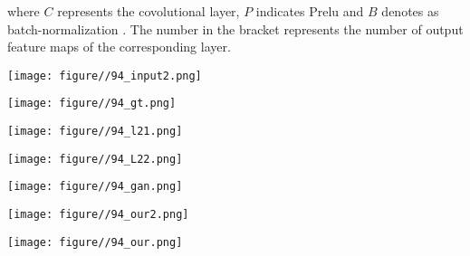\documentclass[10pt,twocolumn,letterpaper]{article}
\begin{document}
\noindent where $C$ represents the covolutional layer,  $P$ indicates Prelu \cite{prelu} and $B$ denotes as batch-normalization \cite{batch_norm}. The number in the bracket represents the number of output feature maps of the corresponding layer.
\begin{figure*}[!]
	\centering
	\begin{minipage}{.135\textwidth}
			\centering
			\texttt{[image: figure//94\_input2.png]}
			\captionsetup{labelformat=empty}
			\captionsetup{justification=centering}
	\end{minipage}
	\begin{minipage}{.135\textwidth}
		\centering
		\texttt{[image: figure//94\_gt.png]}
		\captionsetup{labelformat=empty}
		\captionsetup{justification=centering}
	\end{minipage}
	\begin{minipage}{.135\textwidth}
		\centering
		\texttt{[image: figure//94\_l21.png]}
		\captionsetup{labelformat=empty}
		\captionsetup{justification=centering}
	\end{minipage}	
	\begin{minipage}{.135\textwidth}
			\centering
			\texttt{[image: figure//94\_L22.png]}
			\captionsetup{labelformat=empty}
			\captionsetup{justification=centering}
	\end{minipage}
	\begin{minipage}{.135\textwidth}
		\centering
		\texttt{[image: figure//94\_gan.png]}
		\captionsetup{labelformat=empty}
		\captionsetup{justification=centering}
	\end{minipage}
	\begin{minipage}{.135\textwidth}
		\centering
		\texttt{[image: figure//94\_our2.png]}
		\captionsetup{labelformat=empty}
		\captionsetup{justification=centering}
	\end{minipage}
	\begin{minipage}{.135\textwidth}
		\centering
		\texttt{[image: figure//94\_our.png]}
		\captionsetup{labelformat=empty}

\end{minipage}
\end{figure*}
\end{document}
